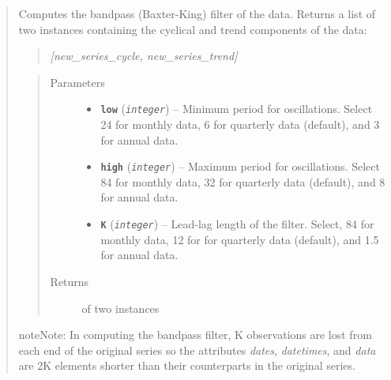 \documentclass[letterpaper,10pt,openany,oneside]{sphinxmanual}
\begin{document}
\begin{fulllineitems}
\begin{quote}
\begin{fulllineitems}
\end{fulllineitems}


\begin{fulllineitems}
\label{series_class:fredpy.series.bpfilter}
Computes the bandpass (Baxter-King) filter of the data. Returns a list of two {\hyperref[series_class:fredpy.series]{}} instances containing the cyclical and trend components of the data:
\begin{quote}

\emph{{[}new\_series\_cycle, new\_series\_trend{]}}
\end{quote}
\begin{quote}\begin{description}
\item[{Parameters}] \leavevmode\begin{itemize}
\item {} 
\textbf{\texttt{low}} (\emph{\texttt{integer}}) -- Minimum period for oscillations. Select 24 for monthly data, 6 for quarterly data (default), and 3 for annual data.

\item {} 
\textbf{\texttt{high}} (\emph{\texttt{integer}}) -- Maximum period for oscillations. Select 84 for monthly data, 32 for quarterly data (default), and 8 for annual data.

\item {} 
\textbf{\texttt{K}} (\emph{\texttt{integer}}) -- Lead-lag length of the filter. Select, 84 for monthly data, 12 for for quarterly data (default), and 1.5 for annual data.

\end{itemize}

\item[{Returns}] \leavevmode
\href{https://docs.python.org/library/functions.html\#list}{} of two {\hyperref[series_class:fredpy.series]{}} instances

\end{description}\end{quote}

\begin{notice}{note}{Note:}
In computing the bandpass filter, K observations are lost from each end of the original series so the attributes \emph{dates}, \emph{datetimes}, and \emph{data} are 2K elements shorter than their counterparts in the original series.
\end{notice}


\end{fulllineitems}
\end{quote}
\end{fulllineitems}
\end{document}
